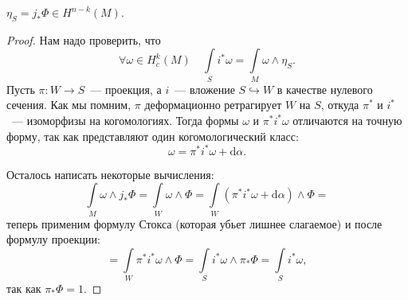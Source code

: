  	 	 \begin{statement} 
 	 	 	$\eta_{S} = j_* \Phi \in H^{n - k}(M)$.
 	 	 \end{statement}

 	 	 \begin{proof}
 	 	 	Нам надо проверить, что 
 	 	 	\[
 	 	 		\forall \omega \in H_c^k(M) \quad \int\limits_{S} i^* \omega = \int\limits_{M} \omega \wedge \eta_{S}.
 	 	 	\]
 	 	 	Пусть $\pi\colon W \to S$~--- проекция, а $i$~--- вложение $S \hookrightarrow W$ в качестве нулевого сечения. Как мы помним, $\pi$ деформационно ретрагирует $W$ на $S$, откуда $\pi^*$ и $i^*$~--- изоморфизы на когомологиях. Тогда формы $\omega $ и $\pi^* i^* \omega$ отличаются на точную форму, так как представляют один когомологический класс: 
 	 	 	\[
 	 	 		\omega = \pi^* i^* \omega + \mathrm{d}\alpha.
 	 	 	\]

 	 	 	Осталось написать некоторые вычисления: 
 	 	 	\[
 	 	 		\int\limits_{M} \omega \wedge j_* \Phi = \int\limits_{W} \omega \wedge \Phi = \int\limits_{W} (\pi^* i^* \omega + \mathrm{d}\alpha) \wedge \Phi =
 	 	 	\]
 	 	 	теперь применим формулу Стокса (которая убьет лишнее слагаемое) и после формулу проекции: 
 	 	 	\[
 	 	 		= \int\limits_{W} \pi^* i^* \omega \wedge \Phi  = \int\limits_{S} i^* \omega \wedge \pi_* \Phi = \int\limits_{S} i^* \omega,
 	 	 	\]
 	 	 	так как $\pi_* \Phi = 1$.
 	 	 \end{proof}

 	 	 





 	 	
 	 

 	 


 	

